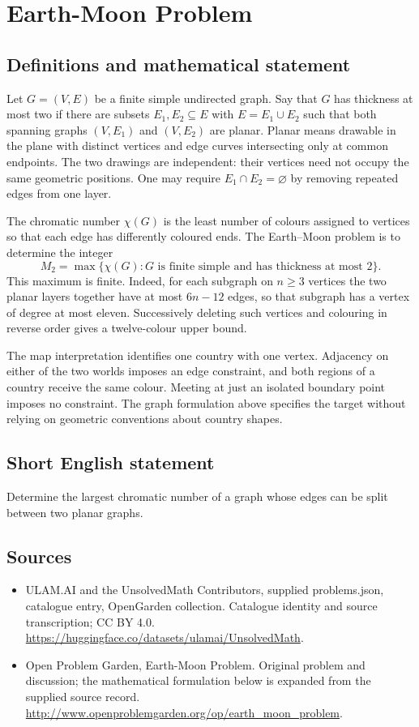 \documentclass[11pt,a4paper]{article}
\begin{document}
\section*{Earth-Moon Problem}\label{statement}

\subsection{Definitions and mathematical statement}
Let $G=(V,E)$ be a finite simple undirected graph. Say that $G$ has thickness
at most two if there are subsets $E_1,E_2\subseteq E$ with
$E=E_1\cup E_2$ such that both spanning graphs $(V,E_1)$ and $(V,E_2)$ are
planar. Planar means drawable in the plane with distinct vertices and
edge curves intersecting only at common endpoints. The two drawings are
independent: their vertices need not occupy the same geometric positions.
One may require $E_1\cap E_2=\varnothing$ by removing repeated edges from
one layer.

The chromatic number $\chi(G)$ is the least number of colours assigned to
vertices so that each edge has differently coloured ends. The Earth--Moon
problem is to determine the integer
\[
 M_2=\max\{\chi(G):G\text{ is finite simple and has thickness at most }2\}.
\]
This maximum is finite. Indeed, for each subgraph on $n\ge3$ vertices the
two planar layers together have at most $6n-12$ edges, so that subgraph has
a vertex of degree at most eleven. Successively deleting such vertices
and colouring in reverse order gives a twelve-colour upper bound.

The map interpretation identifies one country with one vertex. Adjacency
on either of the two worlds imposes an edge constraint, and both regions
of a country receive the same colour. Meeting at just an isolated boundary
point imposes no constraint. The graph formulation above specifies the
target without relying on geometric conventions about country shapes.
\subsection{Short English statement}
Determine the largest chromatic number of a graph whose edges can be split between two planar graphs.
\subsection{Sources}
\begin{itemize}
\item[S1] ULAM.AI and the UnsolvedMath Contributors, supplied problems.json, catalogue entry, OpenGarden collection. Catalogue identity and source transcription; CC BY 4.0.
\url{https://huggingface.co/datasets/ulamai/UnsolvedMath}.
\item[S2] Open Problem Garden, Earth-Moon Problem. Original problem and discussion; the mathematical formulation below is expanded from the supplied source record.
\url{http://www.openproblemgarden.org/op/earth_moon_problem}.
\end{itemize}
\end{document}
